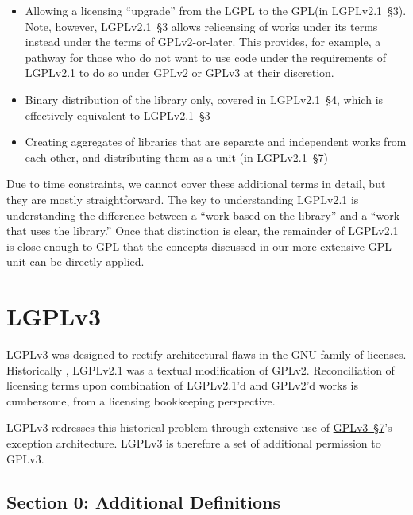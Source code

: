 \begin{itemize}

\item Allowing a licensing ``upgrade'' from the LGPL to the GPL\@ (in LGPLv2.1~\S3).
  Note, however, LGPLv2.1~\S3 allows relicensing of works under its terms
  instead under the terms of GPLv2-or-later.  This provides, for example, a
  pathway for those who do not want to use code under the requirements of
  LGPLv2.1 to do so under GPLv2 or GPLv3 at their discretion.

\item Binary distribution of the library only, covered in LGPLv2.1~\S4,
  which is effectively equivalent to LGPLv2.1~\S3

\item Creating aggregates of libraries that are separate and independent works from
  each other, and distributing them as a unit (in LGPLv2.1~\S7)

\end{itemize}


Due to time constraints, we cannot cover these additional terms in detail,
but they are mostly straightforward. The key to understanding LGPLv2.1 is
understanding the difference between a ``work based on the library'' and a
``work that uses the library.''  Once that distinction is clear, the
remainder of LGPLv2.1 is close enough to GPL that the concepts discussed in
our more extensive GPL unit can be directly applied.

\chapter{LGPLv3}
\label{LGPLv3}

LGPLv3 was designed to rectify  architectural flaws in the GNU family of
licenses.  Historically , LGPLv2.1 was a textual modification of GPLv2.
Reconciliation of licensing terms upon combination of LGPLv2.1'd and GPLv2'd
works is cumbersome, from a licensing bookkeeping perspective.

LGPLv3 redresses this historical problem through extensive use of
\hyperref[GPLv3s7]{GPLv3~\S7}'s exception architecture.  LGPLv3 is therefore
a set of additional permission to GPLv3.


\section{Section 0: Additional Definitions}

